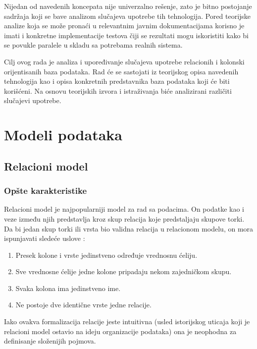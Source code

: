 \documentclass[12pt,oneside]{memoir}
\begin{document}
Nijedan od navedenih koncepata nije univerzalno rešenje, zato je bitno postojanje sadržaja koji se bave analizom slučajeva upotrebe tih tehnologija. Pored teorijske analize koja se može pronaći u relevantnim javnim dokumentacijama korisno je imati i konkretne implementacije testova čiji se rezultati mogu iskoristiti kako bi se povukle paralele u skladu sa potrebama realnih  sistema. 

Cilj ovog rada je analiza i upoređivanje slučajeva upotrebe relacionih i kolonski orijentisanih baza podataka. Rad će se sastojati iz teorijskog opisa navedenih tehnologija kao i opisa konkretnih predstavnika baza podataka koji će biti korišćeni. Na osnovu teorijskih izvora i istraživanja biće analizirani različiti slučajevi upotrebe. 


\chapter{Modeli podataka}
\label{chp:razrada}
\section{Relacioni model}
\subsection{Opšte karakteristike}
Relacioni model je najpopularniji model za rad sa podacima. On podatke kao i veze između njih predstavlja kroz skup relacija koje predstaljaju skupove torki. Da bi jedan skup torki ili vrsta bio validna relacija u relacionom modelu, on mora ispunjavati sledeće uslove \cite{ColumnarOriented}:

\begin{enumerate}
\item[\textbullet] Presek kolone i vrste jedinstveno određuje vrednosnu ćeliju.

\item[\textbullet] Sve vrednosne ćelije jedne kolone pripadaju nekom zajedničkom skupu. 

\item[\textbullet] Svaka kolona ima jedinstveno ime.

\item[\textbullet] Ne postoje dve identične vrste jedne relacije. 
\end{enumerate}

Iako ovakva formalizacija relacije jeste intuitivna (usled istorijskog uticaja koji je relacioni model ostavio na ideju organizacije podataka) ona je neophodna za  definisanje složenijih pojmova. 
\end{document}
